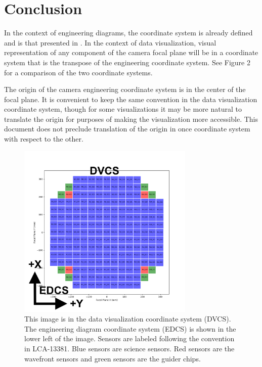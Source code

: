 \section{Conclusion}
In the context of engineering diagrams, the coordinate system is already defined and is that presented in . In the context of data visualization, visual representation of any component of the camera focal plane will be in a coordinate system that is the transpose of the engineering coordinate system.  See Figure 2 for a comparison of the two coordinate systems.

The origin of the camera engineering coordinate system is in the center of the focal plane. It is convenient to keep the same convention in the data visualization coordinate system, though for some visualizations it may be more natural to translate the origin for purposes of making the visualization more accessible. This document does not preclude translation of the origin in once coordinate system with respect to the other.

\begin{figure}[h]
\centering
\includegraphics[width=0.75\textwidth]{figures/fp.png}
\caption{This image is in the data visualization coordinate system (DVCS).  The engineering diagram coordinate system (EDCS) is shown in the lower left of the image.  Sensors are labeled following the convention in LCA-13381. Blue sensors are science sensors.  Red sensors are the wavefront sensors and green sensors are the guider chips.}
\end{figure}
